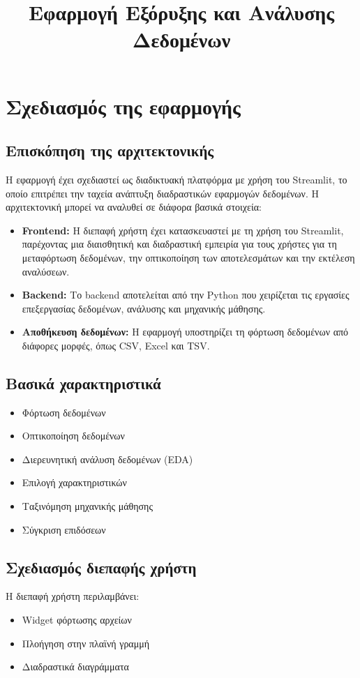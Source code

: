\documentclass{article}
\title{Εφαρμογή Εξόρυξης και Ανάλυσης Δεδομένων}
\author{}
\date{}
\begin{document}
\maketitle

\section{Σχεδιασμός της εφαρμογής}

\subsection{Επισκόπηση της αρχιτεκτονικής}
Η εφαρμογή έχει σχεδιαστεί ως διαδικτυακή πλατφόρμα με χρήση του Streamlit, το οποίο επιτρέπει την ταχεία ανάπτυξη διαδραστικών εφαρμογών δεδομένων. Η αρχιτεκτονική μπορεί να αναλυθεί σε διάφορα βασικά στοιχεία:

\begin{itemize}
    \item \textbf{Frontend:} Η διεπαφή χρήστη έχει κατασκευαστεί με τη χρήση του Streamlit, παρέχοντας μια διαισθητική και διαδραστική εμπειρία για τους χρήστες για τη μεταφόρτωση δεδομένων, την οπτικοποίηση των αποτελεσμάτων και την εκτέλεση αναλύσεων.
    \item \textbf{Backend:} Το backend αποτελείται από την Python που χειρίζεται τις εργασίες επεξεργασίας δεδομένων, ανάλυσης και μηχανικής μάθησης.
    \item \textbf{Αποθήκευση δεδομένων:} Η εφαρμογή υποστηρίζει τη φόρτωση δεδομένων από διάφορες μορφές, όπως CSV, Excel και TSV.
\end{itemize}

\subsection{Βασικά χαρακτηριστικά}
\begin{itemize}
    \item Φόρτωση δεδομένων
    \item Οπτικοποίηση δεδομένων
    \item Διερευνητική ανάλυση δεδομένων (EDA)
    \item Επιλογή χαρακτηριστικών
    \item Ταξινόμηση μηχανικής μάθησης
    \item Σύγκριση επιδόσεων
\end{itemize}

\subsection{Σχεδιασμός διεπαφής χρήστη}
Η διεπαφή χρήστη περιλαμβάνει:
\begin{itemize}
    \item Widget φόρτωσης αρχείων
    \item Πλοήγηση στην πλαϊνή γραμμή
    \item Διαδραστικά διαγράμματα
\end{itemize}
\end{document}
